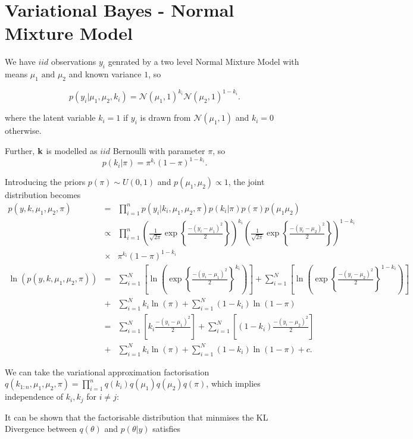 \documentclass[12pt]{article}\usepackage[]{graphicx}\usepackage[]{color}
\begin{document}
\section{Variational Bayes - Normal Mixture Model}

We have $iid$ observations $y_i$ genrated by a two level Normal Mixture Model with means $\mu_1 \mbox{ and } \mu_2$ and known variance $1$, so

$$p(y_i | \mu_1, \mu_2, k_i) = \mathcal{N}(\mu_1, 1)^{k_i} \mathcal{N}(\mu_2, 1)^{1-k_i}.$$

where the latent variable $k_i = 1$ if $y_i$ is drawn from $\mathcal{N}(\mu_1, 1)$ and $k_i = 0$ otherwise.

Further, $\bold{k}$ is modelled as $iid$ Bernoulli with parameter $\pi$, so
$$p(k_i | \pi) = \pi^{k_i} (1-\pi)^{1-k_i}. $$

Introducing the priors $p(\pi) \sim U(0, 1)$ and $p(\mu_1, \mu_2) \propto 1$, the joint distribution becomes
\begin{eqnarray}
\label{1}
p(y, k, \mu_1, \mu_2, \pi) & = & \prod^{n}_{i=1} p(y_i | k_i, \mu_1, \mu_2, \pi) p(k_i | \pi) p(\pi) p(\mu_1 \mu_2) \nonumber \\
& \propto & \prod^{n}_{i=1} \left(\frac{1}{\sqrt{2\pi}} \exp \left\{\frac{-(y_i-\mu_1)^2}{2}\right\}\right)^{k_i} \left(\frac{1}{\sqrt{2\pi}} \exp \left\{\frac{-(y_i-\mu_2)^2}{2}\right\}\right)^{1-k_i} \nonumber \\
& \times & \pi^{k_i} (1-\pi)^{1-k_i} \nonumber \\
\ln(p(y, k, \mu_1, \mu_2, \pi)) & = & \sum_{i=1}^{N} \left[ \ln\left(\exp \left\{\frac{-(y_i-\mu_1)^2}{2}\right\}^{k_i}\right)\right] + \sum_{i=1}^{N} \left[ \ln\left(\exp \left\{\frac{-(y_i-\mu_2)^2}{2}\right\}^{1-k_i}\right)\right] \nonumber \\
& + & \sum_{i=1}^{N} k_i \ln(\pi) + \sum_{i=1}^{N} (1-k_i) \ln(1-\pi) \nonumber \\
& = & \sum_{i=1}^{N} \left[ k_{i} \frac{-(y_i-\mu_1)^2}{2}\right] + \sum_{i=1}^{N} \left[ (1-k_{i}) \frac{-(y_i-\mu_2)^2}{2}\right] \nonumber \\
& + & \sum_{i=1}^{N} k_i \ln(\pi) + \sum_{i=1}^{N} (1-k_i) \ln(1-\pi) + c.
\end{eqnarray}

We can take the variational approximation factorisation $q(k_{1:n}, \mu_1, \mu_2, \pi) = \prod_{i=1}^{n} q(k_i)q(\mu_1)q(\mu_2)q(\pi)$, which implies independence of $k_i, k_j$ for $i \neq j$:

It can be shown that the factorisable distribution that minmises the KL Divergence between $q(\theta)$ and $p(\theta|y)$ satisfies
\end{document}
